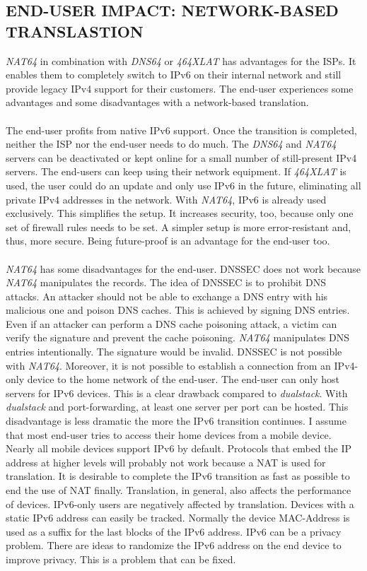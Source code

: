 \documentclass[format=sigconf, natbib=true, nonacm=true]{acmart}
\begin{document}
    \subsection*{END-USER IMPACT: NETWORK-BASED TRANSLASTION}
    \textit{NAT64} in combination with \textit{DNS64} or \textit{464XLAT} has advantages for the ISPs. It enables them to completely switch to IPv6 on their internal network and still provide legacy IPv4 support for their customers. The end-user experiences some advantages and some disadvantages with a network-based translation.\\\\The end-user profits from native IPv6 support. Once the transition is completed, neither the ISP nor the end-user needs to do much. The \textit{DNS64} and \textit{NAT64} servers can be deactivated or kept online for a small number of still-present IPv4 servers. The end-users can keep using their network equipment. If \textit{464XLAT} is used, the user could do an update and only use IPv6 in the future, eliminating all private IPv4 addresses in the network. With \textit{NAT64}, IPv6 is already used exclusively. This simplifies the setup. It increases security, too, because only one set of firewall rules needs to be set. A simpler setup is more error-resistant and, thus, more secure. Being future-proof is an advantage for the end-user too.\\\\\textit{NAT64} has some disadvantages for the end-user. DNSSEC does not work because \textit{NAT64} manipulates the records. The idea of DNSSEC is to prohibit DNS attacks. An attacker should not be able to exchange a DNS entry with his malicious one and poison DNS caches. This is achieved by signing DNS entries. Even if an attacker can perform a DNS cache poisoning attack, a victim can verify the signature and prevent the cache poisoning. \textit{NAT64} manipulates DNS entries intentionally. The signature would be invalid. DNSSEC is not possible with \textit{NAT64}. Moreover, it is not possible to establish a connection from an IPv4-only device to the home network of the end-user. The end-user can only host servers for IPv6 devices. This is a clear drawback compared to \textit{dualstack}. With \textit{dualstack} and port-forwarding, at least one server per port can be hosted. This disadvantage is less dramatic the more the IPv6 transition continues. I assume that most end-user tries to access their home devices from a mobile device. Nearly all mobile devices support IPv6 by default. Protocols that embed the IP address at higher levels will probably not work because a NAT is used for translation. It is desirable to complete the IPv6 transition as fast as possible to end the use of NAT finally. Translation, in general, also affects the performance of devices. IPv6-only users are negatively affected by translation\cite{10.1109/TNET.2015.2453338}. Devices with a static IPv6 address can easily be tracked. Normally the device MAC-Address is used as a suffix for the last blocks of the IPv6 address. IPv6 can be a privacy problem. There are ideas to randomize the IPv6 address on the end device to improve privacy. This is a problem that can be fixed.
\end{document}
